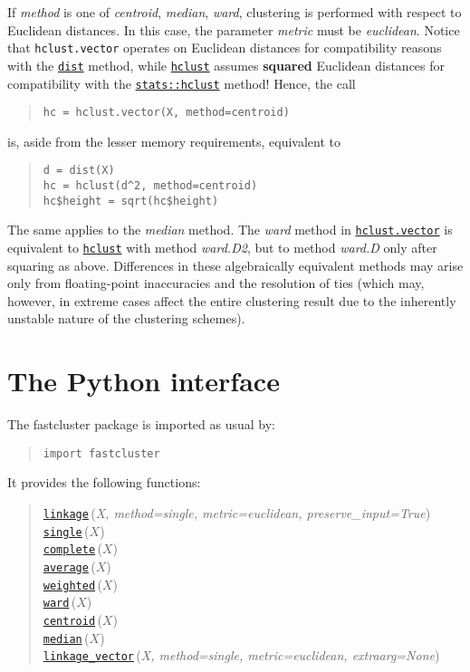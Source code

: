 \documentclass[fontsize=10pt,paper=letter,BCOR=-6mm,DIV=8]{scrartcl}
\makeatletter
\newcommand*\q{\textquotesingle}
\newcommand*\dist{\href{https://stat.ethz.ch/R-manual/R-patched/library/stats/html/dist.html}{\texttt{dist}}}
\newenvironment{methods}{%
  \list{}{\labelwidth\z@
    \itemindent-\leftmargin
    \let\makelabel\methodslabel}%
}{%
  \endlist
}
\newcommand*{\methodslabel}[1]{%
  \hbox to \textwidth{\hspace{\labelsep}%
  \normalfont\bfseries\ttfamily
  #1\hskip-\labelsep\hfill}%
}
\makeatother
\begin{document}
\begin{methods}
If \textit{method} is one of \textit{\q centroid\q}, \textit{\q median\q}, \textit{\q ward\q}, clustering is performed with respect to Euclidean distances. In this case, the parameter \textit{metric} must be \textit{\q euclidean\q}. Notice that \texttt{hclust.vector} operates on Euclidean distances for compatibility reasons with the \dist{} method, while \hyperref[hclust]{\texttt{hclust}} assumes \textbf{squared} Euclidean distances for compatibility with the \href{https://stat.ethz.ch/R-manual/R-patched/library/stats/html/hclust.html}{\texttt{stats::hclust}} method! Hence, the call
\label{squared}
\begin{quote}
\texttt{hc = hclust.vector(X, method=\q centroid\q)}
\end{quote}
is, aside from the lesser memory requirements, equivalent to
\begin{quote}
\texttt{d = dist(X)}\\
\texttt{hc = hclust(d\textasciicircum 2, method=\q centroid\q)}\\
\texttt{hc\$height = sqrt(hc\$height)}
\end{quote}
The same applies to the \textit{\q median\q} method. The \textit{\q ward\q} method in \hyperref[hclust.vector]{\texttt{hclust.vector}} is equivalent to \hyperref[hclust]{\texttt{hclust}} with method \textit{\q ward.D2\q}, but to method \textit{\q ward.D\q} only after squaring as above. Differences in these algebraically equivalent methods may arise only from floating-point inaccuracies and the resolution of ties (which may, however, in extreme cases affect the entire clustering result due to the inherently unstable nature of the clustering schemes).
\end{methods}
\section{The Python interface}

The fastcluster package is imported as usual by:
\begin{quote}
  \texttt{import fastcluster}
\end{quote}

It provides the following functions:
\begin{quote}
    \hyperref[linkage]{\texttt{linkage}}\,(\textit{X, method=\q single\q, metric=\q euclidean\q, preserve\_input=True})\\
    \hyperref[single]{\texttt{single}}\,($X$)\\
    \hyperref[complete]{\texttt{complete}}\,($X$)\\
    \hyperref[average]{\texttt{average}}\,($X$)\\
    \hyperref[weighted]{\texttt{weighted}}\,($X$)\\
    \hyperref[ward]{\texttt{ward}}\,($X$)\\
    \hyperref[centroid]{\texttt{centroid}}\,($X$)\\
    \hyperref[median]{\texttt{median}}\,($X$)\\
    \hyperref[linkage_vector]{\texttt{linkage\_vector}}\,(\textit{X, method=\q single\q, metric=\q euclidean\q, extraarg=None})
\end{quote}
\end{document}
